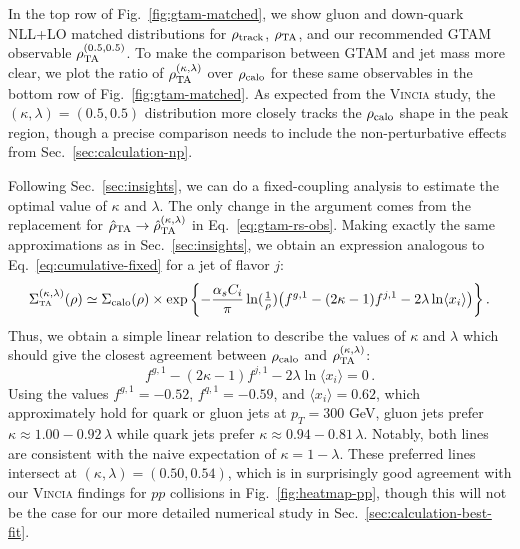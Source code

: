 \documentclass[letterpaper,11pt]{article}
\newcommand{\Fig}[1]{Fig.~\ref{#1}}
\newcommand{\Sec}[1]{Sec.~\ref{#1}}
\newcommand{\Eq}[1]{Eq.~\eqref{#1}}
\begin{document}
In the top row of \Fig{fig:gtam-matched}, we show gluon and down-quark NLL+LO matched distributions for $\rho_{\rm track}$, $\rho_{\rm TA}$, and our recommended GTAM observable $\rho_{\rm TA}^{(0.5,0.5)}$.
%
To make the comparison between GTAM and jet mass more clear, we plot the ratio of $\rho_{\rm TA}^{(\kappa,\lambda)}$ over $\rho_{\rm calo}$ for these same observables in the bottom row of \Fig{fig:gtam-matched}.
%
As expected from the \textsc{Vincia} study, the $(\kappa,\lambda) = (0.5,0.5)$ distribution more closely tracks the $\rho_{\rm calo}$ shape in the peak region, though a precise comparison needs to include the non-perturbative effects from \Sec{sec:calculation-np}.


Following \Sec{sec:insights}, we can do a fixed-coupling analysis to estimate the optimal value of $\kappa$ and $\lambda$.  
%
The only change in the argument comes from the replacement for $\hat{\rho}_{\rm TA} \rightarrow \hat{\rho}_{\rm TA}^{(\kappa,\lambda)}$ in \Eq{eq:gtam-rs-obs}. 
%
Making exactly the same approximations as in \Sec{sec:insights}, we obtain an expression analogous to \Eq{eq:cumulative-fixed} for a jet of flavor $j$: 
\begin{align}\label{eq:cumulative-fixed-gtam}
\begin{split}
\Sigma_{\mbox{\tiny TA}}^{(\kappa,\lambda)}(\rho) \simeq \Sigma_{\rm calo}(\rho)\times \exp\left\{-\frac{\alpha_sC_i}{\pi}\ln(\tfrac{1}{\rho}) \big(f^{g,1}-(2\kappa-1)f^{j,1} -2\lambda \ln \langle x_i\rangle \big) \right\}.
\end{split}
\end{align}
Thus, we obtain a simple linear relation to describe the values of $\kappa$ and $\lambda$ which should give the closest agreement between $\rho_{\rm calo}$ and $\rho_{\rm TA}^{(\kappa,\lambda)}$:
\begin{equation}
\label{eq:gtam-rs-fixed-coupling-min}
f^{g,1}-(2\kappa-1)f^{j,1} -2\lambda \ln \langle x_i\rangle = 0\,.
\end{equation}
Using the values $f^{g,1} = -0.52$, $f^{q,1} = -0.59$, and $\langle x_i\rangle = 0.62$, which approximately hold for quark or gluon jets at $p_T = 300$ GeV, gluon jets prefer $\kappa \approx 1.00 - 0.92 \, \lambda$ while quark jets prefer $\kappa \approx 0.94 - 0.81 \, \lambda$.
%
Notably, both lines are consistent with the naive expectation of $\kappa = 1- \lambda$.
%
These preferred lines intersect at $(\kappa, \lambda) = (0.50, 0.54)$, which is in surprisingly good agreement with our \textsc{Vincia} findings for $pp$ collisions in \Fig{fig:heatmap-pp}, though this will not be the case for our more detailed numerical study in \Sec{sec:calculation-best-fit}.
\end{document}
